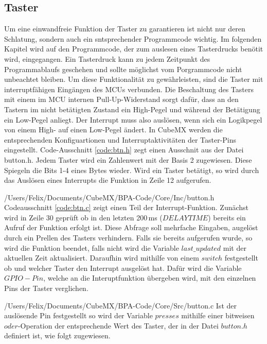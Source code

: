 
\subsection{Taster}
Um eine einwandfreie Funktion der Taster zu garantieren ist nicht nur deren Schlatung, sondern auch ein sntsprechender Programmcode wichtig. Im folgenden Kapitel wird auf den Programmcode, der zum auslesen eines Tasterdrucks benötit wird, eingegangen. Ein Tasterdruck kann zu jedem Zeitpunkt des Programmablaufs geschehen und sollte möglichst vom Porgrammcode nicht unbeachtet bleiben. Um diese Funktionalität zu gewährleisten, sind die Taster mit interruptfähigen Eingängen des MCUs verbunden. Die Beschaltung des Tasters mit einem im MCU internen Pull-Up-Widerstand sorgt dafür, dass an den Tastern im nicht betätigten Zustand ein High-Pegel und während der Betätigung ein Low-Pegel anliegt. Der Interrupt muss also auslösen, wenn sich ein Logikpegel von einem High- auf einen Low-Pegel ändert. In CubeMX werden die entsprechenden Konfiguartionen und Interruptaktivitäten der Taster-Pins eingestellt. Code-Ausschnitt \ref{code:btn.h} zegt einen Ausschnit aus der Datei button.h. Jedem Taster wird ein Zahlenwert mit der Basis 2 zugewiesen. Diese Spiegeln die Bits 1-4 eines Bytes wieder. Wird ein Taster betätigt, so wird  durch das Auslösen eines Interrupts die Funktion in Zeile 12 aufgerufen.

{/Users/Felix/Documents/CubeMX/BPA-Code/Core/Inc/button.h} 
Codeausschnitt \ref{code:btn.c} zeigt einen Teil der Interrupt-Funktion. Zunächst wird in Zeile 30 geprüft ob in den letzten 200\,ms ($DELAYTIME$) bereits ein Aufruf der Funktion erfolgt ist. Diese Abfrage soll mehrfache Eingaben, augelöst durch ein Prellen des Tasters verhindern. Falls sie bereits aufgerufen wurde, so wird die Funktion beendet, falls nicht wird die Variable $last\_updated$ mit der aktuellen Zeit aktualisiert. Daraufhin wird mithilfe von einem $switch$ festgestellt ob und welcher Taster den Interrupt ausgelöst hat. Dafür wird die Variable $GPIO-Pin$, welche an die Interuptfunktion übergeben wird, mit den einzelnen Pins der Taster verglichen. 

{/Users/Felix/Documents/CubeMX/BPA-Code/Core/Src/button.c}
Ist der auslösende Pin festgestellt so wird der Variable $presses$ mithilfe einer bitweisen $oder$-Operation der entsprechende Wert des Taster, der in der Datei $button.h$ definiert ist, wie folgt zugewiesen.
